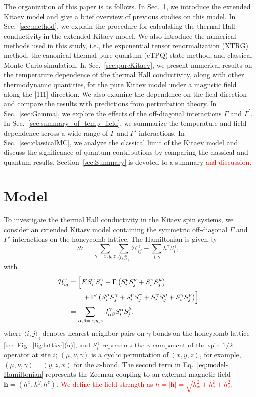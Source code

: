 \documentclass[twocolumn,superscriptaddress,showpacs, longbibliography, aps, prx]{revtex4-2}
\newcommand{\red}[1]{\textcolor{red}{#1}}
\newcommand{\redsout}[1]{\textcolor{red}{\sout{#1}}}
\begin{document}
The organization of this paper is as follows. 
In Sec.~\ref{sec:model}, we introduce the extended Kitaev model and give a brief overview of previous studies on this model. 
In Sec.~\ref{sec:method}, we explain the procedure for calculating the thermal Hall conductivity in the extended Kitaev model. 
We also introduce the numerical methods used in this study, i.e., the exponential tensor renormalization (XTRG) method, the canonical thermal pure quantum (cTPQ) state method, and classical Monte Carlo simulation.
In Sec.~\ref{sec:pureKitaev}, we present numerical results on the temperature dependence of the thermal Hall conductivity, along with other thermodynamic quantities, for the pure Kitaev model under a magnetic field along the [111] direction. 
We also examine the dependence on the field direction and compare the results with predictions from perturbation theory. 
In Sec.~\ref{sec:Gamma}, we explore the effects of the off-diagonal interactions $\Gamma$ and $\Gamma^{\prime}$. 
In Sec.~\ref{sec:summary_of_temp_field}, we summarize the temperature and field dependence across a wide range of $\Gamma$ and $\Gamma'$ interactions.
In Sec.~\ref{sec:classicalMC}, we analyze the classical limit of the Kitaev model and discuss the significance of quantum contributions by comparing the classical and quantum results.
Section~\ref{sec:Summary} is devoted to a summary \redsout{and discussion}.

\section{Model}
\label{sec:model}
To investigate the thermal Hall conductivity in the Kitaev spin systems, we consider an extended Kitaev model containing the symmetric off-diagonal $\Gamma$ and $\Gamma'$ interactions on the honeycomb lattice. 
The Hamiltonian is given by
\begin{equation}
 \mathcal{H} = \sum_{\gamma = x,y,z} \sum_{\langle i,j \rangle_\gamma}\mathcal{H}_{ij}^\gamma -  \sum_{i,\gamma} h^\gamma S_i^\gamma,
 \label{eq:model-Hamiltonian}
\end{equation}
with
\begin{align}
 \mathcal{H}_{ij}^\gamma &= \Bigl[ K S_i^\gamma S_j^\gamma + \Gamma\left( S_i^\mu S_j^\nu + S_i^\nu S_j^\mu \right) \notag\\
&\qquad + \Gamma'\left( S_i^\mu S_j^\gamma + S_i^\nu S_j^\gamma + S_i^\gamma S_j^\mu + S_i^\gamma S_j^\nu \right) \Bigr]\\
&= \sum_{\alpha,\beta = x,y,z} J_{\alpha\beta}^\gamma S_i^\alpha S_j^\beta, 
\end{align}
where $\langle i,j\rangle_\gamma$ denotes nearest-neighbor pairs on $\gamma$-bonds on the honeycomb lattice [see Fig.~\ref{fig:lattice}(a)], and $S_i^\gamma$ represents the $\gamma$ component of the spin-$1/2$ operator at site $i$; $(\mu, \nu, \gamma)$ is a cyclic permutation of $(x,y,z)$, for example, $(\mu, \nu, \gamma)=(y,z,x)$ for the $x$-bond. 
The second term in Eq.~\eqref{eq:model-Hamiltonian} represents the Zeeman coupling to an external magnetic field $\bm{h} = (h^x, h^y, h^z)$. 
\red{We define the field strength as $h = |\bm{h}| = \sqrt{h_x^2+h_y^2+h_z^2}$.} 
\end{document}
